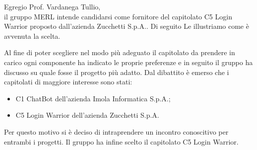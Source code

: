 Egregio Prof. Vardanega Tullio,\\
il gruppo MERL intende candidarsi come fornitore del capitolato C5 Login Warrior proposto dall’azienda Zucchetti S.p.A.. Di seguito Le illustriamo come è avvenuta la scelta.

Al fine di poter scegliere nel modo più adeguato il capitolato da prendere in carico ogni componente ha indicato le proprie preferenze e in seguito il gruppo ha discusso su quale fosse il progetto più adatto.
Dal dibattito è emerso che i capitolati di maggiore interesse sono stati:
\begin{itemize}
    \item C1 ChatBot dell’azienda Imola Informatica S.p.A.;
    \item C5 Login Warrior dell’azienda Zucchetti S.p.A.
\end{itemize}
Per questo motivo si è deciso di intraprendere un incontro conoscitivo per entrambi i progetti.
Il gruppo ha infine scelto il capitolato C5 Login Warrior.
